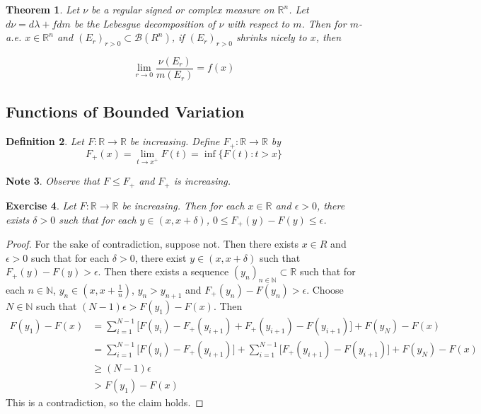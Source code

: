 \documentclass[12pt]{amsart}
\newtheorem{thm}{Theorem}[subsection]
\newtheorem{defn}[thm]{Definition}
\newtheorem{note}[thm]{Note}
\newtheorem{ex}[thm]{Exercise}
\newcommand{\del}{\delta}
\newcommand{\lam}{\lambda}
\newcommand{\ep}{\epsilon}
\newcommand{\N}{\mathbb{N}}
\newcommand{\R}{\mathbb{R}}
\newcommand{\MB}{\mathcal{B}}
\begin{document}
	\begin{thm}
		Let $\nu$ be a regular signed or complex measure on $\R^n$. Let $d\nu = d\lam + f dm$ be the Lebesgue decomposition of $\nu$ with respect to $m$. Then for $m$-a.e. $x \in \R^n$ and $(E_r)_{r >0} \subset \MB(R^n)$, if $(E_r)_{r >0}$ shrinks nicely to $x$, then 
		
		$$\lim_{r \rightarrow 0} \frac{\nu(E_r)}{m(E_r)} = f(x)$$
	\end{thm}
	
	\subsection{Functions of Bounded Variation}
	
	\begin{defn}
		Let $F:\R \rightarrow \R$ be increasing. Define $F_+:\R \rightarrow \R$ by $$F_+(x) = \lim_{t \rightarrow x^+}F(t) = \inf \{F(t): t>x \}$$
	\end{defn}
	
	\begin{note}
		Observe that $F \leq F_+$ and $F_+$ is increasing.
	\end{note}
	
	\begin{ex}
		Let $F:\R \rightarrow \R$ be increasing. Then for each $x \in \R$ and $ \ep>0$, there exists $\del >0$ such that for each $y \in (x,x+\del)$, $0 \leq F_+(y) - F(y) \leq \ep$.
	\end{ex}
	
	\begin{proof}
		For the sake of contradiction, suppose not. Then there exists $x \in R$ and $\ep >0$ such that for each $\del >0$, there exist $y \in (x,x+\del)$ such that $F_+(y) - F(y) > \ep$. Then there exists a sequence $(y_n)_{n \in \N} \subset \R$ such that for each $n \in \N$, $y_n \in (x, x+\frac{1}{n})$, $y_n > y_{n+1}$ and $F_+(y_n) - F(y_n) > \ep$. Choose $N \in \N$ such that $(N-1)\ep > F(y_1) - F(x)$. Then 
		\begin{align*}
			F(y_1) - F(x) 
			&= \sum_{i=1}^{N-1} \bigg[F(y_i)-F_+(y_{i+1}) + F_+(y_{i+1}) - F(y_{i+1}) \bigg] + F(y_N)- F(x)\\
			& = \sum_{i=1}^{N-1} \bigg[F(y_i)-F_+(y_{i+1}) \bigg] + \sum_{i=1}^{N-1} \bigg[ F_+(y_{i+1}) - F(y_{i+1}) \bigg] + F(y_N)- F(x) \\
			& \geq (N-1)\ep \\
			& > F(y_1) - F(x)
		\end{align*}
		This is a contradiction, so the claim holds.
	\end{proof}
	
\end{document}
